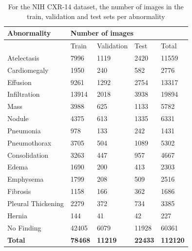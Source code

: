 \documentclass[8pt]{beamer}
\begin{document}
\begin{frame}
  \tiny{
    \begin{table}[]
      \centering
      \begin{tabular}{@{}lllll@{}}
        \toprule
        \textbf{Abnormality} & \multicolumn{4}{l}{\textbf{Number of images}}        \\ \midrule
                             & Train     & Validation & Test      & Total           \\ \midrule
        Atelectasis          & 7996      & 1119       & 2420      & 11559           \\ \midrule
        Cardiomegaly         & 1950      & 240        & 582       & 2776            \\ \midrule
        Effusion             & 9261      & 1292       & 2754      & 13317           \\ \midrule
        Infiltration         & 13914     & 2018       & 3938      & 19894           \\ \midrule
        Mass                 & 3988      & 625        & 1133      & 5782            \\ \midrule
        Nodule               & 4375      & 613        & 1335      & 6331            \\ \midrule
        Pneumonia            & 978       & 133        & 242       & 1431            \\ \midrule
        Pneumothorax         & 3705      & 504        & 1089      & 5302            \\ \midrule
        Consolidation        & 3263      & 447        & 957       & 4667            \\ \midrule
        Edema                & 1690      & 200        & 413       & 2303            \\ \midrule
        Emphysema            & 1799      & 208        & 509       & 2516            \\ \midrule
        Fibrosis             & 1158      & 166        & 362       & 1686            \\ \midrule
        Pleural Thickening   & 2279      & 372        & 734       & 3385            \\ \midrule
        Hernia               & 144       & 41         & 42        & 227             \\ \midrule
        No Finding           & 42405     & 6079       & 11928     & 60361           \\ \midrule
        \textbf{Total}       & \textbf{78468} & \textbf{11219}  & \textbf{22433} & \textbf{112120} \\ \bottomrule
      \end{tabular}
      \caption{For the NIH CXR-14 dataset, the number of images in the train,
        validation and test sets per abnormality}
      \label{tab:nih_split}
    \end{table}
  }
\end{frame}
\end{document}

